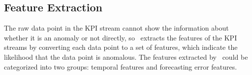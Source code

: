 \subsection{Feature Extraction}
\label{subsubsec:feature_extraction}
The raw data point in the KPI stream cannot show the information about whether it is an anomaly or not directly, so \name~extracts the features of the KPI streams by converting each data point to a set of features, which indicate the likelihood that the data point is anomalous.
The features extracted by \name~could be categorized into two groups: temporal features  and forecasting error features.
\par

